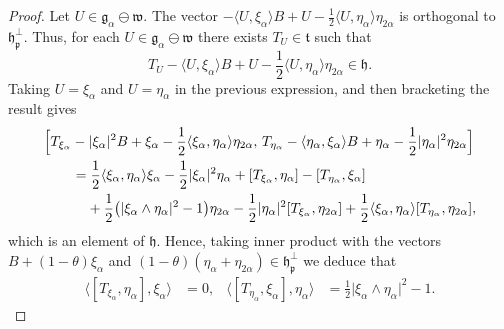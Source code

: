 \documentclass[10pt,a4paper]{amsart}
\newcommand{\g}{\mathfrak}
\begin{document}
\begin{proof}
Let $U\in\g{g}_\alpha\ominus\g{w}$.
The vector $-\langle U,\xi_\alpha\rangle B+U-\frac{1}{2}\langle U,\eta_\alpha\rangle\eta_{2\alpha}$
is orthogonal to $\g{h}_{\g{p}}^\perp$.
Thus, for each $U\in\g{g}_\alpha\ominus\g{w}$ there exists $T_U\in\g{t}$ such that
\begin{equation}\label{eq:tangent-vectors}
T_U-\langle U,\xi_\alpha\rangle B+U-\frac{1}{2}\langle U,\eta_\alpha\rangle\eta_{2\alpha}\in\g{h}.
\end{equation}
Taking $U=\xi_\alpha$ and $U=\eta_\alpha$ in the previous expression, and then bracketing the result gives
\begin{align*}
&
\Bigl[T_{\xi_\alpha}-\lvert\xi_\alpha\rvert^2 B+\xi_\alpha
-\frac{1}{2}\langle \xi_\alpha,\eta_\alpha\rangle\eta_{2\alpha},\,
T_{\eta_\alpha}-\langle \eta_\alpha,\xi_\alpha\rangle B+\eta_\alpha
-\frac{1}{2}\lvert\eta_\alpha\rvert^2\eta_{2\alpha}\Bigr]\\
&\qquad{}=\frac{1}{2}\langle\xi_\alpha,\eta_\alpha\rangle\xi_\alpha
-\frac{1}{2}\lvert\xi_\alpha\rvert^2\eta_\alpha
+[T_{\xi_\alpha},\eta_\alpha]-[T_{\eta_\alpha},\xi_\alpha]\\
&\qquad\phantom{{}=}{}+\frac{1}{2}\bigl(\lvert\xi_\alpha\wedge\eta_\alpha\rvert^2-1\bigr)\eta_{2\alpha}
-\frac{1}{2}\lvert\eta_\alpha\rvert^2[T_{\xi_\alpha},\eta_{2\alpha}]
+\frac{1}{2}\langle\xi_\alpha,\eta_\alpha\rangle[T_{\eta_\alpha},\eta_{2\alpha}],
\end{align*}
which is an element of $\g{h}$.
Hence, taking inner product with the vectors $B+(1-\theta)\xi_\alpha$ and $(1-\theta)(\eta_\alpha+\eta_{2\alpha})\in\g{h}_{\g{p}}^\perp$ we deduce that
\begin{align}\label{eq:Txieta}
\langle[T_{\xi_\alpha},\eta_\alpha],\xi_\alpha\rangle
&{}=0,&
\langle[T_{\eta_\alpha},\xi_\alpha],\eta_\alpha\rangle
&{}=\frac{1}{2}\lvert\xi_\alpha\wedge\eta_\alpha\rvert^2-1.
\end{align}


\end{proof}
\end{document}
